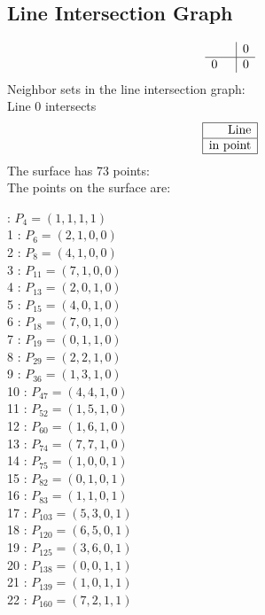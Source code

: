 \documentclass{article}
\begin{document}
{\subsection*{Line Intersection Graph}
{\arraycolsep=1pt
$$
\begin{array}{rr|*{1}r}
 &  & 0\\
\hline
0 &  & 0\\
\end{array}
$$
}%
Neighbor sets in the line intersection graph:\\
Line 0 intersects 
$$
\begin{array}{|r*{0}{|c}|}
\hline
\mbox{Line} \\
\hline
\mbox{in point} \\
\hline
\end{array}
$$
The surface has 73 points:\\
The points on the surface are:\\
\begin{multicols}{3}
 : $P_{4}=( 1, 1, 1, 1 )$\\
1 : $P_{6}=( 2, 1, 0, 0 )$\\
2 : $P_{8}=( 4, 1, 0, 0 )$\\
3 : $P_{11}=( 7, 1, 0, 0 )$\\
4 : $P_{13}=( 2, 0, 1, 0 )$\\
5 : $P_{15}=( 4, 0, 1, 0 )$\\
6 : $P_{18}=( 7, 0, 1, 0 )$\\
7 : $P_{19}=( 0, 1, 1, 0 )$\\
8 : $P_{29}=( 2, 2, 1, 0 )$\\
9 : $P_{36}=( 1, 3, 1, 0 )$\\
10 : $P_{47}=( 4, 4, 1, 0 )$\\
11 : $P_{52}=( 1, 5, 1, 0 )$\\
12 : $P_{60}=( 1, 6, 1, 0 )$\\
13 : $P_{74}=( 7, 7, 1, 0 )$\\
14 : $P_{75}=( 1, 0, 0, 1 )$\\
15 : $P_{82}=( 0, 1, 0, 1 )$\\
16 : $P_{83}=( 1, 1, 0, 1 )$\\
17 : $P_{103}=( 5, 3, 0, 1 )$\\
18 : $P_{120}=( 6, 5, 0, 1 )$\\
19 : $P_{125}=( 3, 6, 0, 1 )$\\
20 : $P_{138}=( 0, 0, 1, 1 )$\\
21 : $P_{139}=( 1, 0, 1, 1 )$\\
22 : $P_{160}=( 7, 2, 1, 1 )$\\

\end{multicols}}
\end{document}
